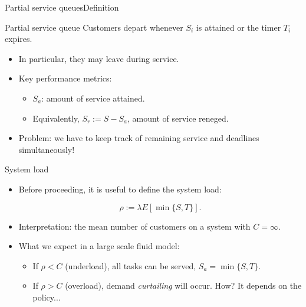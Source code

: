 \documentclass[aspectratio=169]{beamer}
\newenvironment*{myitem}[1][1.5em]{\begin{itemize}\setlength{\itemsep}{#1}}{\end{itemize}}
\begin{document}
\begin{frame}{Partial service queues}{Definition}

	\begin{block}{Partial service queue}
		Customers depart whenever $S_i$ is attained or the timer $T_i$ expires.
	\end{block}
	\vfill

	\pause
	\begin{myitem}
		\item In particular, they may leave \alert{during service}.

		\item Key performance metrics:
		\begin{myitem}[1em]
			\item \alert{$S_a$}: amount of service \alert{attained}.
			\item Equivalently, \alert{$S_r$}$:=S-S_a$, amount of service \alert{reneged}. 
		\end{myitem}

		\pause

		\item \alert{Problem:} we have to keep track of remaining service and deadlines simultaneously!
	\end{myitem}
\end{frame}


\begin{frame}{System load}

	\begin{myitem}
		
	\item Before proceeding, it is useful to define the \alert{system load}:

	\begin{equation*}
		\rho:= \lambda E[\min\{S,T\}].
	\end{equation*}

	\pause

	\item \alert{Interpretation:} the mean number of customers on a system with $C=\infty$.

	\item What we expect in a large scale fluid model:
	
	\begin{itemize}
	 \item If $\rho<C$ (underload), all tasks can be served, $S_a = \min\{S,T\}$.
	 \item If $\rho>C$ (overload), demand \emph{curtailing} will occur. How? It depends on the policy...
	\end{itemize}

	\end{myitem}


\end{frame}
\end{document}
